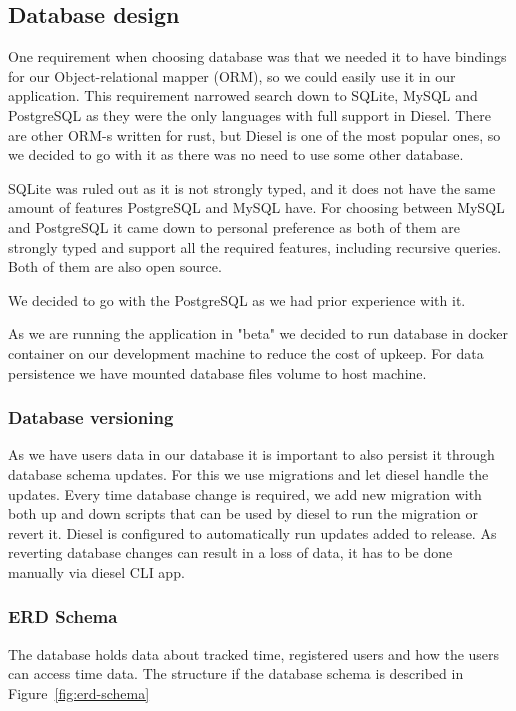 \subsection{Database design}\label{subsec:database-design}
One requirement when choosing database was that we needed it to have bindings for our Object-relational mapper (ORM),
so we could easily use it in our application.
This requirement narrowed search down to SQLite, MySQL and PostgreSQL as they were the only languages with full support in Diesel.
There are other ORM-s written for rust, but Diesel is one of the most popular ones, so we decided to go with it as
there was no need to use some other database.

SQLite was ruled out as it is not strongly typed, and it does not have the same amount of features PostgreSQL and MySQL have.
For choosing between MySQL and PostgreSQL it came down to personal preference as both of them are strongly typed and
support all the required features, including recursive queries.
Both of them are also open source.

We decided to go with the PostgreSQL as we had prior experience with it.

As we are running the application in "beta" we decided to run database in docker container on our development machine to
reduce the cost of upkeep.
For data persistence we have mounted database files volume to host machine.

\subsubsection{Database versioning}\label{subsubsec:database-versioning}
As we have users data in our database it is important to also persist it through database schema updates.
For this we use migrations and let diesel handle the updates.
Every time database change is required, we add new migration with both up and down scripts that can be used by diesel
to run the migration or revert it.
Diesel is configured to automatically run updates added to release.
As reverting database changes can result in a loss of data, it has to be done manually via diesel CLI app.

\subsubsection{ERD Schema}\label{subsubsec:erd-schema}
The database holds data about tracked time, registered users and how the users can access time data.
The structure if the database schema is described in Figure~\ref{fig:erd-schema}

